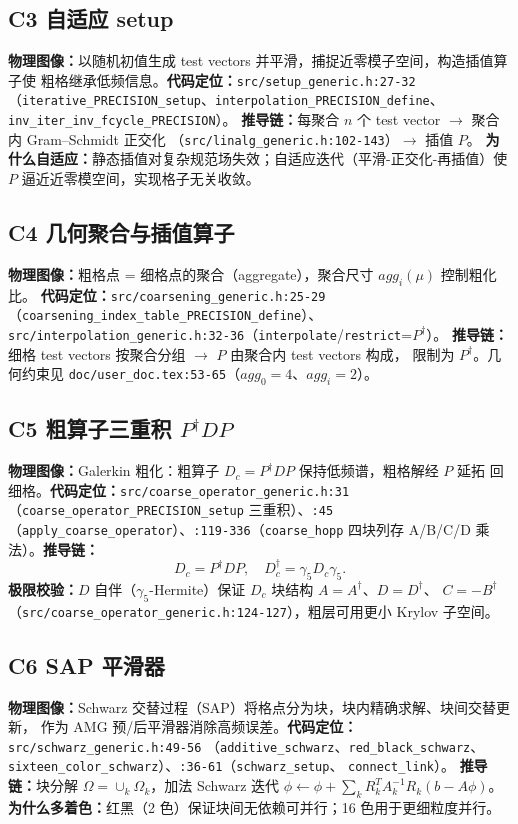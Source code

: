\documentclass[UTF8]{ctexart}
\begin{document}
\subsection{C3 自适应 setup}
\textbf{物理图像：}以随机初值生成 test vectors 并平滑，捕捉近零模子空间，构造插值算子使
粗格继承低频信息。\textbf{代码定位：}\nolinkurl{src/setup_generic.h:27-32}
（\nolinkurl{iterative_PRECISION_setup}、\nolinkurl{interpolation_PRECISION_define}、
\nolinkurl{inv_iter_inv_fcycle_PRECISION}）。
\textbf{推导链：}每聚合 $n$ 个 test vector $\rightarrow$ 聚合内 Gram--Schmidt 正交化
（\nolinkurl{src/linalg_generic.h:102-143}）$\rightarrow$ 插值 $P$。
\textbf{为什么自适应：}静态插值对复杂规范场失效；自适应迭代（平滑-正交化-再插值）使
$P$ 逼近近零模空间，实现格子无关收敛。

\subsection{C4 几何聚合与插值算子}
\textbf{物理图像：}粗格点 = 细格点的聚合（aggregate），聚合尺寸 $agg_i(\mu)$ 控制粗化比。
\textbf{代码定位：}\nolinkurl{src/coarsening_generic.h:25-29}
（\nolinkurl{coarsening_index_table_PRECISION_define}）、
\nolinkurl{src/interpolation_generic.h:32-36}（\texttt{interpolate}/\texttt{restrict}=$P^\dagger$）。
\textbf{推导链：}细格 test vectors 按聚合分组 $\rightarrow$ $P$ 由聚合内 test vectors 构成，
限制为 $P^\dagger$。几何约束见 \texttt{doc/user\_doc.tex:53-65}（$agg_0=4$、$agg_i=2$）。

\subsection{C5 粗算子三重积 $P^\dagger D P$}
\textbf{物理图像：}Galerkin 粗化：粗算子 $D_c=P^\dagger D P$ 保持低频谱，粗格解经 $P$ 延拓
回细格。\textbf{代码定位：}\nolinkurl{src/coarse_operator_generic.h:31}
（\nolinkurl{coarse_operator_PRECISION_setup} 三重积）、\texttt{:45}
（\texttt{apply\_coarse\_operator}）、\texttt{:119-336}（\texttt{coarse\_hopp} 四块列存
A/B/C/D 乘法）。\textbf{推导链：}
\begin{equation}\label{eq:galerkin}
D_c = P^\dagger D P,\quad D_c^{\dagger}=\gamma_5 D_c\gamma_5 .
\end{equation}
\textbf{极限校验：}$D$ 自伴（$\gamma_5$-Hermite）保证 $D_c$ 块结构 $A=A^\dagger$、$D=D^\dagger$、
$C=-B^\dagger$（\nolinkurl{src/coarse_operator_generic.h:124-127}），粗层可用更小 Krylov 子空间。

\subsection{C6 SAP 平滑器}
\textbf{物理图像：}Schwarz 交替过程（SAP）将格点分为块，块内精确求解、块间交替更新，
作为 AMG 预/后平滑器消除高频误差。\textbf{代码定位：}\nolinkurl{src/schwarz_generic.h:49-56}
（\texttt{additive\_schwarz}、\texttt{red\_black\_schwarz}、
\texttt{sixteen\_color\_schwarz}）、\texttt{:36-61}（\texttt{schwarz\_setup}、
\texttt{connect\_link}）。
\textbf{推导链：}块分解 $\Omega=\cup_k\Omega_k$，加法 Schwarz 迭代
$\phi \leftarrow \phi + \sum_k R_k^T A_k^{-1} R_k(b - A\phi)$。
\textbf{为什么多着色：}红黑（2 色）保证块间无依赖可并行；16 色用于更细粒度并行。
\end{document}
